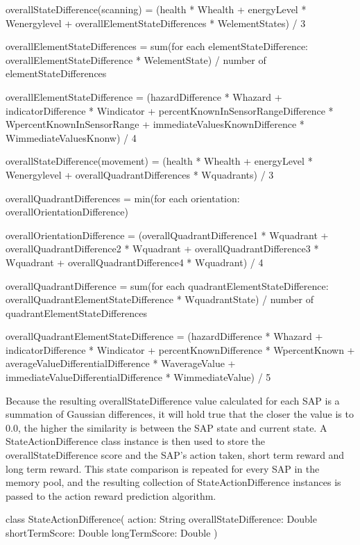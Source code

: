 \begin{listings}
overallStateDifference(scanning) = (health * Whealth + energyLevel * Wenergylevel + overallElementStateDifferences * WelementStates) / 3

overallElementStateDifferences = sum(for each elementStateDifference: overallElementStateDifference * WelementState) / number of elementStateDifferences

overallElementStateDifference = (hazardDifference * Whazard + indicatorDifference * Windicator + percentKnownInSensorRangeDifference * WpercentKnownInSensorRange + immediateValuesKnownDifference * WimmediateValuesKnonw) / 4

overallStateDifference(movement) = (health * Whealth + energyLevel * Wenergylevel + overallQuadrantDifferences * Wquadrants) / 3

overallQuadrantDifferences = min(for each orientation: overallOrientationDifference)

overallOrientationDifference = (overallQuadrantDifference1 * Wquadrant + overallQuadrantDifference2 * Wquadrant + overallQuadrantDifference3 * Wquadrant + overallQuadrantDifference4 * Wquadrant) / 4

overallQuadrantDifference = sum(for each quadrantElementStateDifference: overallQuadrantElementStateDifference * WquadrantState) / number of quadrantElementStateDifferences

overallQuadrantElementStateDifference = (hazardDifference * Whazard + indicatorDifference * Windicator + percentKnownDifference * WpercentKnown + averageValueDifferentialDifference * WaverageValue + immediateValueDifferentialDifference * WimmediateValue) / 5
\end{listings}


Because the resulting overallStateDifference value calculated for each SAP is a summation of Gaussian differences, it will hold true that the closer the value is to 0.0, the higher the similarity is between the SAP state and current state.
A StateActionDifference class instance is then used to store the overallStateDifference score and the SAP's action taken, short term reward and long term reward.
This state comparison is repeated for every SAP in the memory pool, and the resulting collection of StateActionDifference instances is passed to the action reward prediction algorithm. 

\begin{listings}
class StateActionDifference(
  action: String
  overallStateDifference: Double
  shortTermScore: Double
  longTermScore: Double
)
\end{listings}


